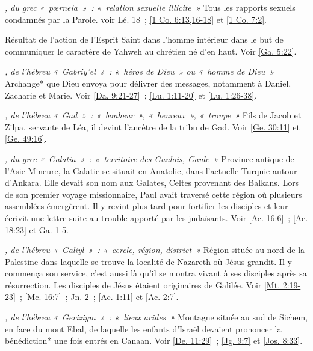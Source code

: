 \begin{multicols}{2}
\textit{, du grec «~pœrneia~»~: «~relation sexuelle illicite~»}\newline
Tous les rapports sexuels condamnés par la Parole. voir Lé. 18~; \vref{1 Co. 6:13,16-18} et \vref{1 Co. 7:2}.

\textit{}\newline
Résultat de l'action de l'Esprit Saint dans l'homme intérieur dans le but de communiquer le caractère de Yahweh au chrétien né d'en haut. Voir \vref{Ga. 5:22}.

\textit{, de l'hébreu «~Gabriy'el~»~: «~héros de Dieu~» ou «~homme de Dieu~»}\newline
Archange* que Dieu envoya pour délivrer des messages, notamment à Daniel, Zacharie et Marie. Voir \vref{Da. 9:21-27}~; \vref{Lu. 1:11-20} et \vref{Lu. 1:26-38}.

\textit{, de l'hébreu «~Gad~»~: «~bonheur~», «~heureux~», «~troupe~»}\newline
Fils de Jacob et Zilpa, servante de Léa, il devint l'ancêtre de la tribu de Gad. Voir \vref{Ge. 30:11} et \vref{Ge. 49:16}.

\textit{, du grec «~Galatia~»~: «~territoire des Gaulois, Gaule~»}\newline
Province antique de l'Asie Mineure, la Galatie se situait en Anatolie, dans l'actuelle Turquie autour d'Ankara. Elle devait son nom aux Galates, Celtes provenant des Balkans. Lors de son premier voyage missionnaire, Paul avait traversé cette région où plusieurs assemblées émergèrent. Il y revint plus tard pour fortifier les disciples et leur écrivit une lettre suite au trouble apporté par les judaïsants. Voir \vref{Ac. 16:6}~; \vref{Ac. 18:23} et Ga. 1-5.

\textit{, de l'hébreu «~Galiyl~»~: «~cercle, région, district~»}\newline
Région située au nord de la Palestine dans laquelle se trouve la localité de Nazareth où Jésus grandit. Il y commença son service, c'est aussi là qu'il se montra vivant à ses disciples après sa résurrection. Les disciples de Jésus étaient originaires de Galilée. Voir \vref{Mt. 2:19-23}~; \vref{Mc. 16:7}~; Jn. 2~; \vref{Ac. 1:11} et \vref{Ac. 2:7}.

\textit{, de l'hébreu «~Geriziym~»~: «~lieux arides~»}\newline
Montagne située au sud de Sichem, en face du mont Ebal, de laquelle les enfants d'Israël devaient prononcer la bénédiction* une fois entrés en Canaan. Voir \vref{De. 11:29}~; \vref{Jg. 9:7} et \vref{Jos. 8:33}.


\end{multicols}
